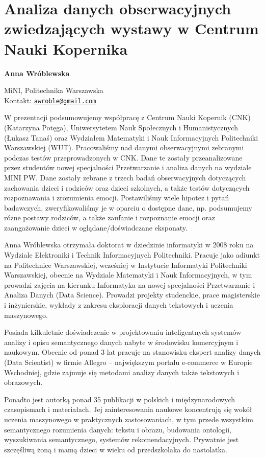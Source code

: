 \documentclass[\main/boa.tex]{subfiles}
\begin{document}
\section{Analiza danych obserwacyjnych zwiedzających wystawy w Centrum Nauki Kopernika}


\begin{minipage}{0.915\textwidth}
	\centering
  {\bf \LARGE {} Anna Wróblewska}
\end{minipage}


\begin{affiliations}
\begin{minipage}{0.915\textwidth}
\centering
\large MiNI, Politechnika Warszawska  \\[1pt]
Kontakt: \href{mailto:awroble@gmail.com}{\nolinkurl{awroble@gmail.com}}\\
\end{minipage}
\end{affiliations}

W prezentacji podsumowujemy współpracę z Centrum Nauki Kopernik (CNK) \break (Katarzyna Potęga), Uniwersytetem Nauk Społecznych i Humanistycznych (Łukasz Tanaś) oraz Wydziałem Matematyki i Nauk Informacyjnych Politechniki Warszawskiej (WUT). Pracowaliśmy nad danymi obserwacyjnymi zebranymi podczas testów przeprowadzonych w CNK. Dane te zostały przeanalizowane przez studentów nowej specjalności \break Przetwarzanie i analiza danych na wydziale MINI PW.
Dane zostały zebrane z trzech badań obserwacyjnych dotyczących zachowania dzieci i rodziców oraz dzieci szkolnych, a także testów dotyczących rozpoznawania i zrozumienia emocji.
Postawiliśmy wiele hipotez i pytań badawczych, zweryfikowaliśmy je w oparciu o dostępne dane, np. podsumujemy różne postawy rodziców, a także zaufanie i rozpoznanie emocji oraz zaangażowanie dzieci w oglądane/doświadczane eksponaty. 

\bio
Anna Wróblewska otrzymała doktorat w dziedzinie informatyki w 2008 roku na Wydziale Elektroniki i Technik Informacyjnych Politechniki. Pracuje jako adiunkt na Politechnice Warszawskiej, wcześniej w Instytucie Informatyki Politechniki Warszawskiej, obecnie na Wydziale Matematyki i Nauk Informacyjnych, w tym prowadzi zajęcia na kierunku Informatyka na nowej specjalności Przetwarzanie i Analiza Danych (Data Science). Prowadzi projekty studenckie, prace magisterskie i inżynierskie, wykłady z zakresu eksploracji danych tekstowych i uczenia maszynowego.

Posiada kilkuletnie doświadczenie w projektowaniu inteligentnych systemów analizy i opisu semantycznego danych nabyte w środowisku komercyjnym i naukowym. Obecnie od ponad 3 lat pracuje na stanowisku ekspert analizy danych (Data Scientist) w firmie Allegro – największym portalu e-commerce w Europie Wschodniej, gdzie zajmuje się metodami analizy danych także tekstowych i obrazowych.

Ponadto jest autorką ponad 35 publikacji w polskich i międzynarodowych czasopismach i materiałach. Jej zainteresowania naukowe koncentrują się wokół uczenia maszynowego w praktycznych zastosowaniach, w tym przede wszystkim semantycznego rozumienia danych: tekstu i obrazu, budowania ontologii, wyszukiwania semantycznego, systemów rekomendacyjnych. Prywatnie jest szczęśliwą żoną i mamą dzieci w wieku od przedszkolaka do nastolatka.
\end{document}

